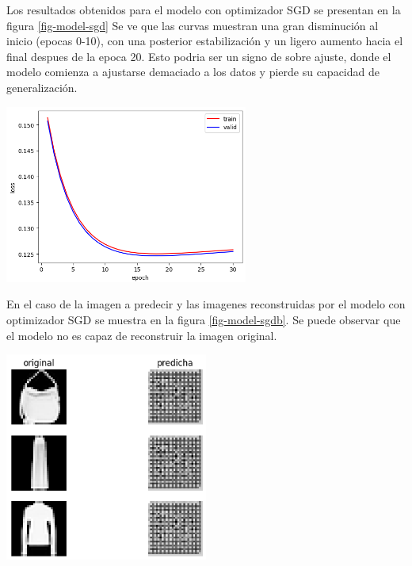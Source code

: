 \documentclass[aps,prl,reprint,groupedaddress]{revtex4-2}
\newenvironment{Figura}
  {\par\medskip\noindent\minipage{\linewidth}}
  {\endminipage\par\medskip}
\begin{document}
Los resultados obtenidos para el modelo con optimizador SGD se presentan en la
figura \ref{fig-model-sgd} Se ve que las curvas muestran una gran disminución 
al inicio (epocas 0-10), con una posterior estabilización y un ligero aumento 
hacia el final despues de la epoca 20. Esto podria ser un signo de sobre ajuste,
donde el modelo comienza a ajustarse demaciado a los datos y pierde su capacidad
de generalización.

\begin{Figura}
  \centering
  \includegraphics[width=0.60\textwidth]{figs/modelo_con_sdg.png}
  \label{fig-model-sgd}
\end{Figura}

En el caso de la imagen a predecir y las imagenes reconstruidas por el modelo
con optimizador SGD se muestra en la figura \ref{fig-model-sgdb}. Se puede
observar que el modelo no es capaz de reconstruir la imagen original.

\begin{Figura}
  \centering
  \includegraphics[width=0.5\textwidth]{figs/test_modelo_sdg.png}
  \label{fig-model-sgdb}
\end{Figura}
\end{document}
